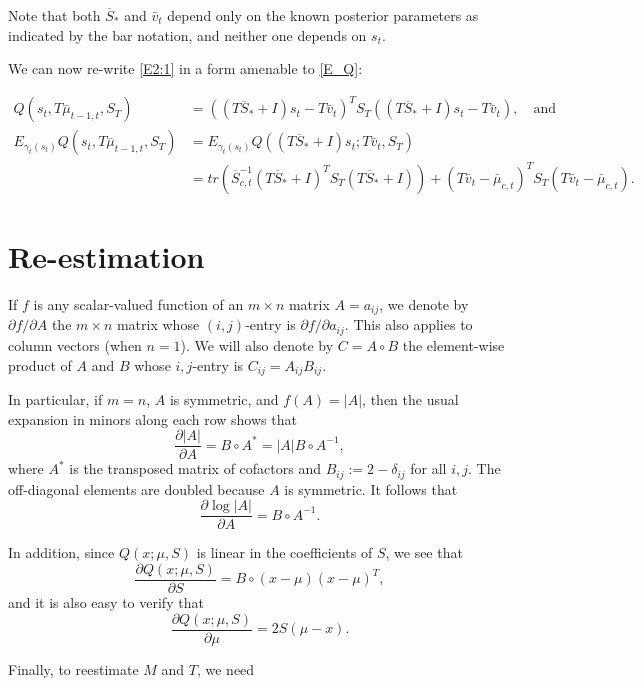 \documentclass[12pt,leqno]{article}
\begin{document}
Note that both $\overline{S}_*$ and $\bar{v}_t$  depend only on the known posterior parameters as indicated
by the bar notation, and neither one depends on $s_t$.

We can now re-write \eqref{E2:1} in a form amenable to \eqref{E_Q}:

\begin{equation}\label{mu_t-1,t}
  \begin{split}
    Q(s_t,T\bar{\mu}_{t-1,t},S_T) &= ((T\overline{S}_*+I)s_t - T\bar{v}_t)^TS_T((T\overline{S}_* + I)s_t - T\bar{v}_t),\quad\text{and}\\
    E_{\gamma_t(s_t)}Q(s_t,T\bar{\mu}_{t-1,t},S_T) &= E_{\gamma_t(s_t)}Q((T\overline{S}_*+ I)s_t;T\bar{v}_t,S_T)\\
    &= tr(\overline{S}_{c,t}^{-1}(T\overline{S}_*+I)^TS_T(T\overline{S}_* + I)) + (T\bar{v}_t - \bar{\mu}_{c,t})^TS_T(T\bar{v}_t-\bar{\mu}_{c,t}).
  \end{split}
\end{equation}


\section{Re-estimation}
If $f$ is any scalar-valued function of an $m\times{n}$ matrix $A = a_{ij}$, we denote by $\partial{f}/\partial{A}$ the 
$m\times{n}$ matrix whose $(i,j)$-entry is $\partial{f}/\partial{a_{ij}}$.  This also applies to column vectors
(when $n=1$). We will also denote by $C = A\circ{B}$ the element-wise product of $A$ and $B$ whose $i,j$-entry is
$C_{ij} = A_{ij}B_{ij}$.

In particular, if $m=n$, $A$ is symmetric, and $f(A) = |A|$,  then the usual expansion 
in minors along each row shows that 
$$
\frac{\partial{|A|}}{\partial{A}} = B\circ{A}^* = |A|B\circ{A}^{-1},
$$
where $A^*$ is the transposed matrix of cofactors and $B_{ij} := 2-\delta_{ij}$ for all $i,j$.
The off-diagonal elements are doubled because $A$ is symmetric.
It follows that
$$
\frac{\partial{\log|A|}}{\partial{A}} = B\circ{A}^{-1}. 
$$

In addition, since $Q(x;\mu,S)$ is linear in the coefficients of $S$, we see that
$$
\frac{\partial{Q(x;\mu,S)}}{\partial{S}} = B\circ(x-\mu)(x-\mu)^T,
$$
and it is also easy to verify that
$$
\frac{\partial{Q(x;\mu,S)}}{\partial{\mu}} = 2S(\mu-x).
$$

Finally, to reestimate $M$ and $T$, we need
\end{document}
